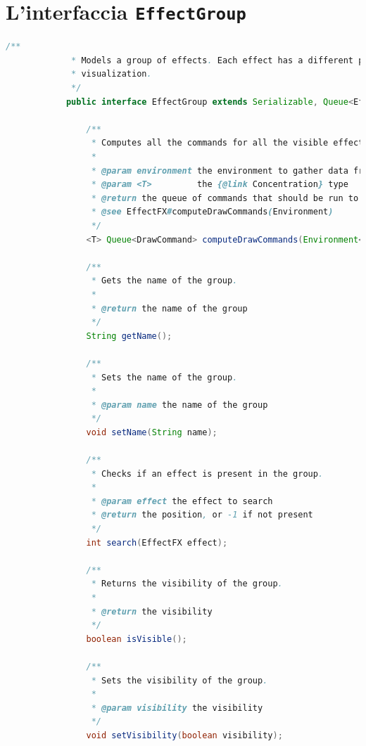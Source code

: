     \chapter{L'interfaccia \texttt{EffectGroup}}\label{appendix:effectgroup}
        \begin{lstlisting}[language=Java]
            /**
             * Models a group of effects. Each effect has a different priority of
             * visualization.
             */
            public interface EffectGroup extends Serializable, Queue<EffectFX> {

                /**
                 * Computes all the commands for all the visible effects in this group.
                 *
                 * @param environment the environment to gather data from
                 * @param <T>         the {@link Concentration} type
                 * @return the queue of commands that should be run to draw the effects of the group
                 * @see EffectFX#computeDrawCommands(Environment)
                 */
                <T> Queue<DrawCommand> computeDrawCommands(Environment<T> environment);

                /**
                 * Gets the name of the group.
                 *
                 * @return the name of the group
                 */
                String getName();

                /**
                 * Sets the name of the group.
                 *
                 * @param name the name of the group
                 */
                void setName(String name);

                /**
                 * Checks if an effect is present in the group.
                 *
                 * @param effect the effect to search
                 * @return the position, or -1 if not present
                 */
                int search(EffectFX effect);

                /**
                 * Returns the visibility of the group.
                 *
                 * @return the visibility
                 */
                boolean isVisible();

                /**
                 * Sets the visibility of the group.
                 *
                 * @param visibility the visibility
                 */
                void setVisibility(boolean visibility);


\end{lstlisting}
